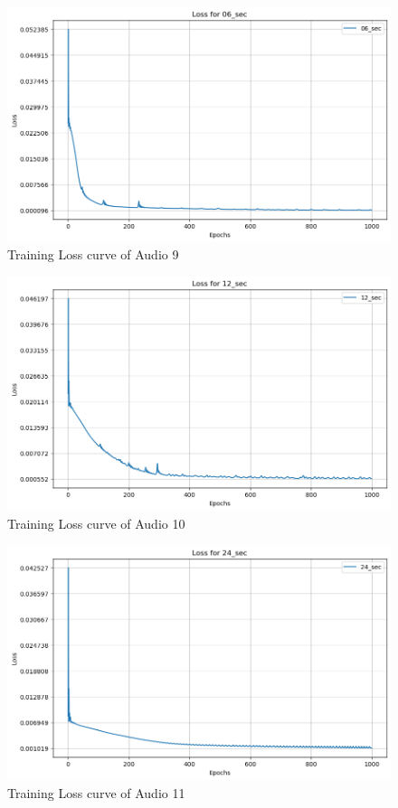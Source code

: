 \documentclass{ioereport}
\begin{document}
    \begin{figure}[H]
        \centering
        \includegraphics[width=\linewidth]{assets/audio_loss_curves/06seconds.png}
        \caption{Training Loss curve of Audio 9}
        \label{fig:loss-curve-9}
    \end{figure}
    \begin{figure}[H]
        \centering
        \includegraphics[width=\linewidth]{assets/audio_loss_curves/12seconds.png}
        \caption{Training Loss curve of Audio 10}
        \label{fig:loss-curve-10}
    \end{figure}
    \begin{figure}[H]
        \centering
        \includegraphics[width=\linewidth]{assets/audio_loss_curves/24seconds.png}
        \caption{Training Loss curve of Audio 11}
        \label{fig:loss-curve-11}
    \end{figure}
\end{document}
